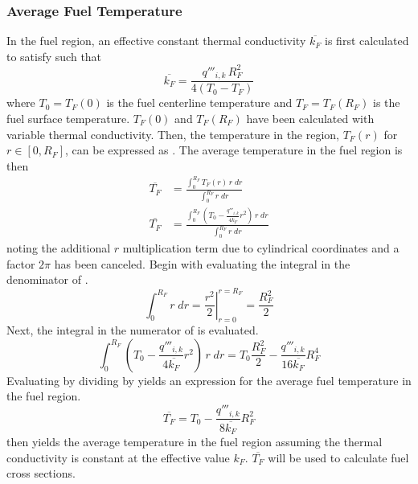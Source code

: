    \subsubsection{Average Fuel Temperature}
      In the fuel region, an effective constant thermal conductivity
      $\overline{k_F}$ is first calculated to satisfy
       such that
      \begin{equation}
        \label{eq:kfuel_constant}
        \overline{k_F} = \frac{q'''_{i,k} \, R_F^2}{4(T_0-T_F)}
      \end{equation}
      where $T_0 = T_F(0)$ is the fuel centerline temperature and
      $T_F=T_F(R_F)$ is the fuel surface temperature.
      $T_F(0)$ and $T_F(R_F)$ have been calculated with variable thermal
      conductivity. Then, the temperature in the region, $T_F(r)$ for $r \in 
      [0,R_F]$, can be expressed as . The average temperature in
      the fuel region is then
      \begin{align}
        \overline{T_F} &= \frac{\int_0^{R_F} T_F(r) \, r \; dr}
          {\int_0^{R_F} r \; dr} \\
        \label{eq:tfbar_integral}
        \overline{T_F} &= \frac{\int_0^{R_F} \left( T_0 - 
          \frac{q'''_{i,k}}{4 \overline{k_F}}
          r^2\right) \, r \; dr}{\int_0^{R_F} r \; dr}
      \end{align}
      noting the additional $r$ multiplication term due to cylindrical
      coordinates and a factor $2 \pi$ has been canceled. Begin with evaluating
      the integral in the denominator of
      .
      \begin{equation}
        \label{eq:tf_denominator}
        \int_0^{R_F} r \; dr = \left. \frac{r^2}{2} \right|_{r=0}^{r=R_F} = 
          \frac{R_F^2}{2}
      \end{equation}
      Next, the integral in the numerator of  is 
      evaluated.
      \begin{equation}
        \label{eq:tf_numerator}
        \int_0^{R_F} \left( T_0 - \frac{q'''_{i,k}}{4 \overline{k_F}} r^2 \right)
          \, r \; dr = T_0 \frac{R_F^2}{2} - 
          \frac{q'''_{i,k}}{16 \overline{k_F}} R_F^4
      \end{equation}
      Evaluating  by dividing  by
       yields an expression for the average fuel
      temperature in the fuel region.
      \begin{equation}
        \label{eq:tf_bar}
        \overline{T_F} = T_0 - \frac{q'''_{i,k}}{8 \overline{k_F}} R_F^2
      \end{equation}
       then yields the average temperature in the fuel region
      assuming the thermal conductivity is constant at the effective value
      $k_F$. $\overline{T_F}$ will be used to calculate fuel cross sections. 


